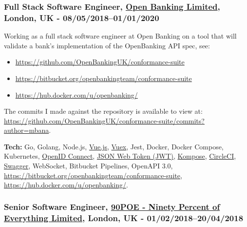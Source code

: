 \documentclass[
  a4paper,
  8pt,
]{article}
\providecommand{\tightlist}{%
  \setlength{\itemsep}{0pt}\setlength{\parskip}{0pt}}
\begin{document}
\begin{multicols}{2}
{\subsubsection{\texorpdfstring{Full Stack Software Engineer,
\href{https://www.openbanking.org.uk}{Open Banking Limited}, London, UK
-
08/05/2018--01/01/2020}{Full Stack Software Engineer, Open Banking Limited, London, UK - 08/05/2018--01/01/2020}}\label{full-stack-software-engineer-open-banking-limited-london-uk---0805201801012020}}

Working as a full stack software engineer at Open Banking on a tool that
will validate a bank's implementation of the OpenBanking API spec, see:

\begin{itemize}
\tightlist
\item
  \url{https://github.com/OpenBankingUK/conformance-suite}
\item
  \url{https://bitbucket.org/openbankingteam/conformance-suite}
\item
  \url{https://hub.docker.com/u/openbanking/}
\end{itemize}

The commits I made against the repository is available to view at:
\url{https://github.com/OpenBankingUK/conformance-suite/commits?author=mbana}.

\textbf{Tech:} Go, Golang, Node.js, \href{https://vuejs.org/}{Vue.js},
\href{https://vuex.vuejs.org/}{Vuex}, Jest, Docker, Docker Compose,
Kubernetes, \href{https://openid.net/connect/}{OpenID Connect},
\href{https://jwt.io/}{JSON Web Token (JWT)},
\href{http://kompose.io/}{Kompose},
\href{https://circleci.com/}{CircleCI},
\href{https://swagger.io/}{Swagger}, WebSocket, Bitbucket Pipelines,
OpenAPI 3.0,
\url{https://bitbucket.org/openbankingteam/conformance-suite},
\url{https://hub.docker.com/u/openbanking/}.

\hypertarget{senior-software-engineer-90poe---ninety-percent-of-everything-limited-london-uk---0102201820042018}{%
\subsubsection{\texorpdfstring{Senior Software Engineer,
\href{https://www.90poe.io/}{90POE - Ninety Percent of Everything
Limited}, London, UK -
01/02/2018--20/04/2018}{Senior Software Engineer, 90POE - Ninety Percent of Everything Limited, London, UK - 01/02/2018--20/04/2018}}\label{senior-software-engineer-90poe---ninety-percent-of-everything-limited-london-uk---0102201820042018}}


\end{multicols}
\end{document}
